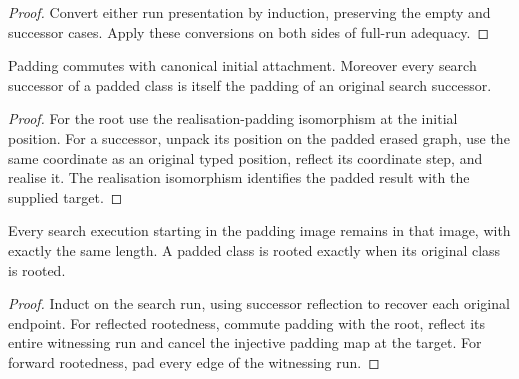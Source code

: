 \begin{proof}
Convert either run presentation by induction, preserving the empty and successor cases. Apply these conversions on both sides of full-run adequacy.
\end{proof}




\begin{lemma}
Padding commutes with canonical initial attachment. Moreover every search successor of a padded class is itself the padding of an original search successor.
\end{lemma}

\begin{proof}
For the root use the realisation-padding isomorphism at the initial position. For a successor, unpack its position on the padded erased graph, use the same coordinate as an original typed position, reflect its coordinate step, and realise it. The realisation isomorphism identifies the padded result with the supplied target.
\end{proof}




\begin{lemma}
Every search execution starting in the padding image remains in that image, with exactly the same length. A padded class is rooted exactly when its original class is rooted.
\end{lemma}

\begin{proof}
Induct on the search run, using successor reflection to recover each original endpoint. For reflected rootedness, commute padding with the root, reflect its entire witnessing run and cancel the injective padding map at the target. For forward rootedness, pad every edge of the witnessing run.
\end{proof}





